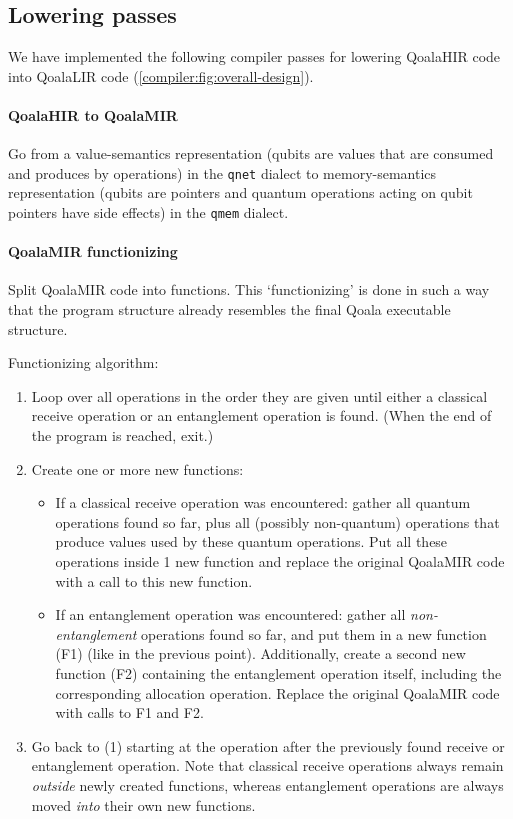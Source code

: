 \subsection{Lowering passes}
We have implemented the following compiler passes for lowering QoalaHIR code into QoalaLIR code (\cref{compiler:fig:overall-design}).

\paragraph{QoalaHIR to QoalaMIR}
Go from a value-semantics representation (qubits are values that are consumed and produces by operations) in the \texttt{qnet} dialect to memory-semantics representation (qubits are pointers and quantum operations acting on qubit pointers have side effects) in the \texttt{qmem} dialect.

\paragraph{QoalaMIR functionizing}
Split QoalaMIR code into functions.
This `functionizing' is done in such a way that the program structure already resembles the final Qoala executable structure.

Functionizing algorithm:
\begin{enumerate}
\item Loop over all operations in the order they are given until either a classical receive operation or an entanglement operation is found. (When the end of the program is reached, exit.)
\item Create one or more new functions:
    \begin{itemize}
        \item If a classical receive operation was encountered: gather all quantum operations found so far, plus all (possibly non-quantum) operations that produce values used by these quantum operations.
        Put all these operations inside 1 new function and replace the original QoalaMIR code with a call to this new function.
        \item If an entanglement operation was encountered: gather all \emph{non-entanglement} operations found so far, and put them in a new function (F1) (like in the previous point).
        Additionally, create a second new function (F2) containing the entanglement operation itself, including the corresponding allocation operation. Replace the original QoalaMIR code with calls to F1 and F2.
    \end{itemize}
\item Go back to (1) starting at the operation after the previously found receive or entanglement operation. Note that classical receive operations always remain \emph{outside} newly created functions, whereas entanglement operations are always moved \emph{into} their own new functions.
\end{enumerate}

